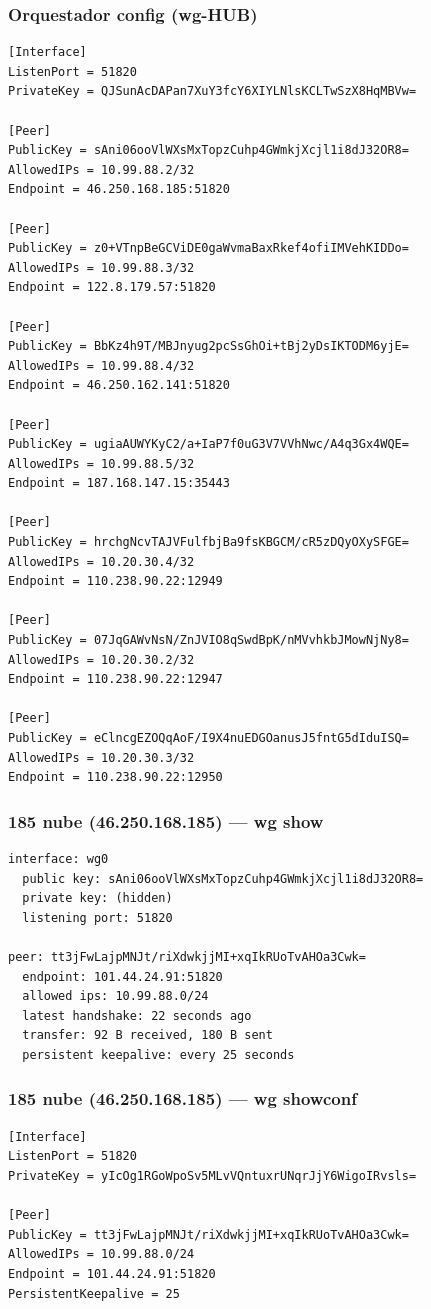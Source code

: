 \documentclass[11pt,a4paper]{article}
\begin{document}
\subsubsection*{Orquestador config (wg-HUB)}
\begin{lstlisting}
[Interface]
ListenPort = 51820
PrivateKey = QJSunAcDAPan7XuY3fcY6XIYLNlsKCLTwSzX8HqMBVw=

[Peer]
PublicKey = sAni06ooVlWXsMxTopzCuhp4GWmkjXcjl1i8dJ32OR8=
AllowedIPs = 10.99.88.2/32
Endpoint = 46.250.168.185:51820

[Peer]
PublicKey = z0+VTnpBeGCViDE0gaWvmaBaxRkef4ofiIMVehKIDDo=
AllowedIPs = 10.99.88.3/32
Endpoint = 122.8.179.57:51820

[Peer]
PublicKey = BbKz4h9T/MBJnyug2pcSsGhOi+tBj2yDsIKTODM6yjE=
AllowedIPs = 10.99.88.4/32
Endpoint = 46.250.162.141:51820

[Peer]
PublicKey = ugiaAUWYKyC2/a+IaP7f0uG3V7VVhNwc/A4q3Gx4WQE=
AllowedIPs = 10.99.88.5/32
Endpoint = 187.168.147.15:35443

[Peer]
PublicKey = hrchgNcvTAJVFulfbjBa9fsKBGCM/cR5zDQyOXySFGE=
AllowedIPs = 10.20.30.4/32
Endpoint = 110.238.90.22:12949

[Peer]
PublicKey = 07JqGAWvNsN/ZnJVIO8qSwdBpK/nMVvhkbJMowNjNy8=
AllowedIPs = 10.20.30.2/32
Endpoint = 110.238.90.22:12947

[Peer]
PublicKey = eClncgEZOQqAoF/I9X4nuEDGOanusJ5fntG5dIduISQ=
AllowedIPs = 10.20.30.3/32
Endpoint = 110.238.90.22:12950

\end{lstlisting}

\subsubsection*{185 nube (46.250.168.185) — wg show}
\begin{lstlisting}
interface: wg0
  public key: sAni06ooVlWXsMxTopzCuhp4GWmkjXcjl1i8dJ32OR8=
  private key: (hidden)
  listening port: 51820

peer: tt3jFwLajpMNJt/riXdwkjjMI+xqIkRUoTvAHOa3Cwk=
  endpoint: 101.44.24.91:51820
  allowed ips: 10.99.88.0/24
  latest handshake: 22 seconds ago
  transfer: 92 B received, 180 B sent
  persistent keepalive: every 25 seconds

\end{lstlisting}

\subsubsection*{185 nube (46.250.168.185) — wg showconf}
\begin{lstlisting}
[Interface]
ListenPort = 51820
PrivateKey = yIcOg1RGoWpoSv5MLvVQntuxrUNqrJjY6WigoIRvsls=

[Peer]
PublicKey = tt3jFwLajpMNJt/riXdwkjjMI+xqIkRUoTvAHOa3Cwk=
AllowedIPs = 10.99.88.0/24
Endpoint = 101.44.24.91:51820
PersistentKeepalive = 25

\end{lstlisting}
\end{document}
